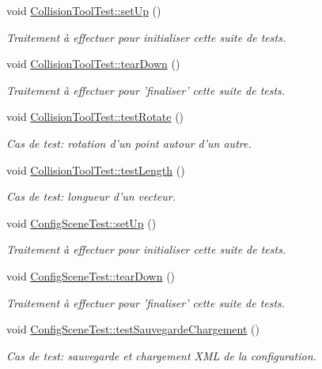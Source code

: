 \begin{DoxyCompactItemize}
void \hyperlink{group__inf2990_ga6924da693899b253751b489928bd5e04}{Collision\-Tool\-Test\-::set\-Up} ()
\begin{DoxyCompactList}\small\item\em Traitement à effectuer pour initialiser cette suite de tests. \end{DoxyCompactList}\item 
void \hyperlink{group__inf2990_gae8e5960d925ec082674afdd45e7ea368}{Collision\-Tool\-Test\-::tear\-Down} ()
\begin{DoxyCompactList}\small\item\em Traitement à effectuer pour 'finaliser' cette suite de tests. \end{DoxyCompactList}\item 
void \hyperlink{group__inf2990_gabd062c4f55b2f09df44c6defd20bea7f}{Collision\-Tool\-Test\-::test\-Rotate} ()
\begin{DoxyCompactList}\small\item\em Cas de test\-: rotation d'un point autour d'un autre. \end{DoxyCompactList}\item 
void \hyperlink{group__inf2990_ga0951a401c6a0fb9bdd17c990827e6d57}{Collision\-Tool\-Test\-::test\-Length} ()
\begin{DoxyCompactList}\small\item\em Cas de test\-: longueur d'un vecteur. \end{DoxyCompactList}\item 
void \hyperlink{group__inf2990_ga707d7400843047e67b736ab79bafb5a0}{Config\-Scene\-Test\-::set\-Up} ()
\begin{DoxyCompactList}\small\item\em Traitement à effectuer pour initialiser cette suite de tests. \end{DoxyCompactList}\item 
void \hyperlink{group__inf2990_ga889ed3891c3e55280cabb982953906d9}{Config\-Scene\-Test\-::tear\-Down} ()
\begin{DoxyCompactList}\small\item\em Traitement à effectuer pour 'finaliser' cette suite de tests. \end{DoxyCompactList}\item 
void \hyperlink{group__inf2990_ga0f09d52bc30d87f18b0341e1052efb74}{Config\-Scene\-Test\-::test\-Sauvegarde\-Chargement} ()
\begin{DoxyCompactList}\small\item\em Cas de test\-: sauvegarde et chargement X\-M\-L de la configuration. \end{DoxyCompactList}\item 

\end{DoxyCompactItemize}

